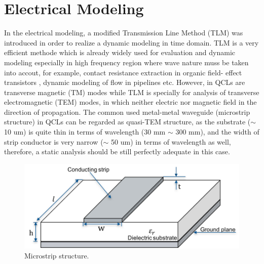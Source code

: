 \documentclass[11pt,final]{scrbook}
\begin{document}
\chapter{Electrical Modeling}
In the electrical modeling, a modified Transmission Line Method (TLM) was introduced in order to realize a dynamic modeling in time domain. TLM is a very efficient methode which is already widely used for evaluation and dynamic modeling especially in high frequency region where wave nature muss be taken into accout, for example, contact resistance extraction in organic field- effect transistors \cite{xu2010modified}, dynamic modeling of flow in pipelines \cite{johnston2014enhanced} etc. However, in QCLs are transverse magnetic (TM) modes \cite{yan2009directional} while TLM is specially for analysis of transverse electromagnetic (TEM) modes, in which neither electric nor magnetic field in the direction of propagation. The common used metal-metal waveguide (microstrip structure) in QCLs can be regarded as quasi-TEM structure, as the substrate ($ \sim $ 10 um) is quite thin in terms of wavelength (30 mm $ \sim $ 300 mm), and the width of strip conductor is very narrow ($ \sim $ 50 um) in terms of wavelength as well, therefore, a static analysis should be still perfectly adequate in this case.

\begin{figure}[htbp]
\begin{center}
\includegraphics[scale=0.8]{Microstrip.pdf}
\caption{Microstrip structure.}
\label{fig:Microstrip}
\end{center}
\end{figure}
\end{document}
